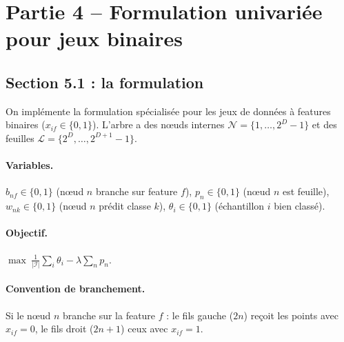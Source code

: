 \documentclass[a4paper,10pt,titlepage,leqno]{article}
\begin{document}
\section{Partie 4 -- Formulation univariée pour jeux binaires}
\label{sec:part4}

\subsection{Section 5.1 : la formulation}

On implémente la formulation spécialisée pour les jeux de données à features binaires ($x_{if} \in \{0,1\}$). L'arbre a des nœuds internes $\mathcal{N} = \{1, \ldots, 2^D{-}1\}$ et des feuilles $\mathcal{L} = \{2^D, \ldots, 2^{D+1}{-}1\}$.

\paragraph{Variables.}
$b_{nf} \in \{0,1\}$ (nœud $n$ branche sur feature $f$),
$p_n \in \{0,1\}$ (nœud $n$ est feuille),
$w_{nk} \in \{0,1\}$ (nœud $n$ prédit classe $k$),
$\theta_i \in \{0,1\}$ (échantillon $i$ bien classé).

\paragraph{Objectif.} $\displaystyle\max\ \frac{1}{|\mathcal{I}|}\sum_{i} \theta_i - \lambda \sum_{n} p_n$.

\paragraph{Convention de branchement.} Si le nœud $n$ branche sur la feature $f$ : le fils gauche ($2n$) reçoit les points avec $x_{if}=0$, le fils droit ($2n+1$) ceux avec $x_{if}=1$.
\end{document}
